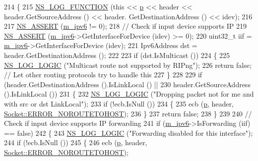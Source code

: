\begin{DoxyCode}
214 \{
215   \hyperlink{log-macros-disabled_8h_a90b90d5bad1f39cb1b64923ea94c0761}{NS\_LOG\_FUNCTION} (\textcolor{keyword}{this} << \hyperlink{lte__link__budget_8m_ac9de518908a968428863f829398a4e62}{p} << header << header.GetSourceAddress () << header.
      GetDestinationAddress () << idev);
216 
217   \hyperlink{assert_8h_a6dccdb0de9b252f60088ce281c49d052}{NS\_ASSERT} (\hyperlink{classns3_1_1RipNg_aca7a023799ce2004499a826ba5d5d3fe}{m\_ipv6} != 0);
218   \textcolor{comment}{// Check if input device supports IP}
219   \hyperlink{assert_8h_a6dccdb0de9b252f60088ce281c49d052}{NS\_ASSERT} (\hyperlink{classns3_1_1RipNg_aca7a023799ce2004499a826ba5d5d3fe}{m\_ipv6}->GetInterfaceForDevice (idev) >= 0);
220   uint32\_t iif = \hyperlink{classns3_1_1RipNg_aca7a023799ce2004499a826ba5d5d3fe}{m\_ipv6}->GetInterfaceForDevice (idev);
221   Ipv6Address dst = header.GetDestinationAddress ();
222 
223   \textcolor{keywordflow}{if} (dst.IsMulticast ())
224     \{
225       \hyperlink{group__logging_ga88acd260151caf2db9c0fc84997f45ce}{NS\_LOG\_LOGIC} (\textcolor{stringliteral}{"Multicast route not supported by RIPng"});
226       \textcolor{keywordflow}{return} \textcolor{keyword}{false}; \textcolor{comment}{// Let other routing protocols try to handle this}
227     \}
228 
229   \textcolor{keywordflow}{if} (header.GetDestinationAddress ().IsLinkLocal () ||
230       header.GetSourceAddress ().IsLinkLocal ())
231     \{
232       \hyperlink{group__logging_ga88acd260151caf2db9c0fc84997f45ce}{NS\_LOG\_LOGIC} (\textcolor{stringliteral}{"Dropping packet not for me and with src or dst LinkLocal"});
233       \textcolor{keywordflow}{if} (!ecb.IsNull ())
234         \{
235           ecb (\hyperlink{lte__link__budget_8m_ac9de518908a968428863f829398a4e62}{p}, header, \hyperlink{classns3_1_1Socket_ada1328c5ae0c28cb2a982caf8f6d6ccaa0f8ecb5a4ddbce3bade35fa12c3d49e8}{Socket::ERROR\_NOROUTETOHOST});
236         \}
237       \textcolor{keywordflow}{return} \textcolor{keyword}{false};
238     \}
239 
240   \textcolor{comment}{// Check if input device supports IP forwarding}
241   \textcolor{keywordflow}{if} (\hyperlink{classns3_1_1RipNg_aca7a023799ce2004499a826ba5d5d3fe}{m\_ipv6}->IsForwarding (iif) == \textcolor{keyword}{false})
242     \{
243       \hyperlink{group__logging_ga88acd260151caf2db9c0fc84997f45ce}{NS\_LOG\_LOGIC} (\textcolor{stringliteral}{"Forwarding disabled for this interface"});
244       \textcolor{keywordflow}{if} (!ecb.IsNull ())
245         \{
246           ecb (\hyperlink{lte__link__budget_8m_ac9de518908a968428863f829398a4e62}{p}, header, \hyperlink{classns3_1_1Socket_ada1328c5ae0c28cb2a982caf8f6d6ccaa0f8ecb5a4ddbce3bade35fa12c3d49e8}{Socket::ERROR\_NOROUTETOHOST});

\end{DoxyCode}

